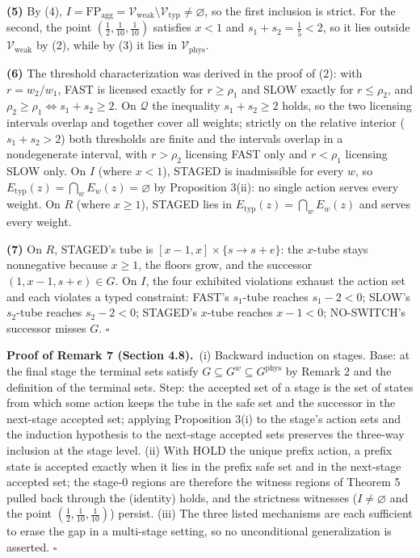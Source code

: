 \documentclass[3p,11pt]{elsarticle}
\begin{document}
\textbf{(5)} By (4),
\(I = \mathrm{FP}_{\mathrm{agg}} = \mathcal{V}_{\mathrm{weak}} \setminus \mathcal{V}_{\mathrm{typ}} \neq \varnothing\),
so the first inclusion is strict. For the second, the point
\((\tfrac12, \tfrac1{10}, \tfrac1{10})\) satisfies \(x < 1\) and
\(s_1 + s_2 = \tfrac15 < 2\), so it lies outside
\(\mathcal{V}_{\mathrm{weak}}\) by (2), while by (3) it lies in
\(\mathcal{V}_{\mathrm{phys}}\).

\textbf{(6)} The threshold characterization was derived in the proof of
(2): with \(r = w_2 / w_1\), FAST is licensed exactly for
\(r \ge \rho_1\) and SLOW exactly for \(r \le \rho_2\), and
\(\rho_2 \ge \rho_1 \iff s_1 + s_2 \ge 2\). On \(\mathcal{Q}\) the
inequality \(s_1 + s_2 \ge 2\) holds, so the two licensing intervals
overlap and together cover all weights; strictly on the relative
interior (\(s_1 + s_2 > 2\)) both thresholds are finite and the
intervals overlap in a nondegenerate interval, with \(r > \rho_2\)
licensing FAST only and \(r < \rho_1\) licensing SLOW only. On \(I\)
(where \(x < 1\)), STAGED is inadmissible for every \(w\), so
\(E_{\mathrm{typ}}(z) = \bigcap_w E_w(z) = \varnothing\) by Proposition
3(ii): no single action serves every weight. On \(R\) (where
\(x \ge 1\)), STAGED lies in \(E_{\mathrm{typ}}(z) = \bigcap_w E_w(z)\)
and serves every weight.

\textbf{(7)} On \(R\), STAGED's tube is
\([x - 1, x] \times \{s \to s + e\}\): the \(x\)-tube stays nonnegative
because \(x \ge 1\), the floors grow, and the successor
\((1, x - 1, s + e) \in G\). On \(I\), the four exhibited violations
exhaust the action set and each violates a typed constraint: FAST's
\(s_1\)-tube reaches \(s_1 - 2 < 0\); SLOW's \(s_2\)-tube reaches
\(s_2 - 2 < 0\); STAGED's \(x\)-tube reaches \(x - 1 < 0\); NO-SWITCH's
successor misses \(G\). \ensuremath{\square}

\textbf{Proof of Remark 7 (Section 4.8).}\ (i) Backward induction on stages. Base: at the final stage
the terminal sets satisfy
\(G \subseteq G^w \subseteq G^{\mathrm{phys}}\) by Remark 2 and the
definition of the terminal sets. Step: the accepted set of a stage is
the set of states from which some action keeps the tube in the safe set
and the successor in the next-stage accepted set; applying Proposition
3(i) to the stage's action sets and the induction hypothesis to the
next-stage accepted sets preserves the three-way inclusion at the stage
level. (ii) With HOLD the unique prefix action, a prefix state is
accepted exactly when it lies in the prefix safe set and in the
next-stage accepted set; the stage-0 regions are therefore the witness
regions of Theorem 5 pulled back through the (identity) holds, and the
strictness witnesses (\(I \neq \varnothing\) and the point
\((\tfrac12, \tfrac1{10}, \tfrac1{10})\)) persist. (iii) The three
listed mechanisms are each sufficient to erase the gap in a multi-stage
setting, so no unconditional generalization is asserted. \ensuremath{\square}
\end{document}
